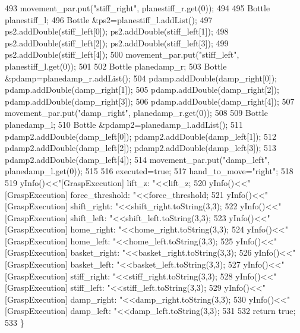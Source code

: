 \begin{DoxyCode}
493     movement\_par.put(\textcolor{stringliteral}{"stiff\_right"}, planestiff\_r.get(0));
494 
495     Bottle planestiff\_l;
496     Bottle &ps2=planestiff\_l.addList();
497     ps2.addDouble(stiff\_left[0]); ps2.addDouble(stiff\_left[1]);
498     ps2.addDouble(stiff\_left[2]); ps2.addDouble(stiff\_left[3]);
499     ps2.addDouble(stiff\_left[4]);
500     movement\_par.put(\textcolor{stringliteral}{"stiff\_left"}, planestiff\_l.get(0));
501 
502     Bottle planedamp\_r;
503     Bottle &pdamp=planedamp\_r.addList();
504     pdamp.addDouble(damp\_right[0]); pdamp.addDouble(damp\_right[1]);
505     pdamp.addDouble(damp\_right[2]); pdamp.addDouble(damp\_right[3]);
506     pdamp.addDouble(damp\_right[4]);
507     movement\_par.put(\textcolor{stringliteral}{"damp\_right"}, planedamp\_r.get(0));
508 
509     Bottle planedamp\_l;
510     Bottle &pdamp2=planedamp\_l.addList();
511     pdamp2.addDouble(damp\_left[0]); pdamp2.addDouble(damp\_left[1]);
512     pdamp2.addDouble(damp\_left[2]); pdamp2.addDouble(damp\_left[3]);
513     pdamp2.addDouble(damp\_left[4]);
514     movement\_par.put(\textcolor{stringliteral}{"damp\_left"}, planedamp\_l.get(0));
515 
516     executed=\textcolor{keyword}{true};
517     hand\_to\_move=\textcolor{stringliteral}{"right"};
518 
519     yInfo()<<\textcolor{stringliteral}{"[GraspExecution] lift\_z:        "}<<lift\_z;
520     yInfo()<<\textcolor{stringliteral}{"[GraspExecution] force\_threshold: "}<<force\_threshold;
521     yInfo()<<\textcolor{stringliteral}{"[GraspExecution] shift\_right:   "}<<shift\_right.toString(3,3);
522     yInfo()<<\textcolor{stringliteral}{"[GraspExecution] shift\_left:    "}<<shift\_left.toString(3,3);
523     yInfo()<<\textcolor{stringliteral}{"[GraspExecution] home\_right:    "}<<home\_right.toString(3,3);
524     yInfo()<<\textcolor{stringliteral}{"[GraspExecution] home\_left:     "}<<home\_left.toString(3,3);
525     yInfo()<<\textcolor{stringliteral}{"[GraspExecution] basket\_right:  "}<<basket\_right.toString(3,3);
526     yInfo()<<\textcolor{stringliteral}{"[GraspExecution] basket\_left:   "}<<basket\_left.toString(3,3);
527     yInfo()<<\textcolor{stringliteral}{"[GraspExecution] stiff\_right:   "}<<stiff\_right.toString(3,3);
528     yInfo()<<\textcolor{stringliteral}{"[GraspExecution] stiff\_left:    "}<<stiff\_left.toString(3,3);
529     yInfo()<<\textcolor{stringliteral}{"[GraspExecution] damp\_right:    "}<<damp\_right.toString(3,3);
530     yInfo()<<\textcolor{stringliteral}{"[GraspExecution] damp\_left:     "}<<damp\_left.toString(3,3);
531 
532     \textcolor{keywordflow}{return} \textcolor{keyword}{true};
533 \}
\end{DoxyCode}
